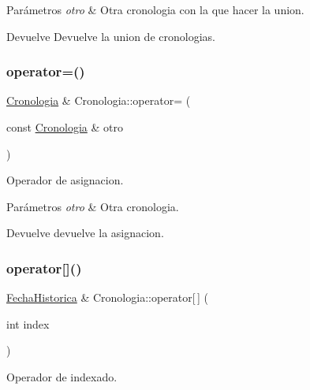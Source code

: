 \begin{DoxyParams}{Parámetros}
{\em otro} & Otra cronologia con la que hacer la union. \\
\hline
\end{DoxyParams}
\begin{DoxyReturn}{Devuelve}
Devuelve la union de cronologias. 
\end{DoxyReturn}
\mbox{\label{classCronologia_a0b6b86e97a98461ff5ecdd7eb72ae4b9}} 
\subsubsection{\texorpdfstring{operator=()}{operator=()}}
{\footnotesize\ttfamily \hyperlink{classCronologia}{Cronologia} \& Cronologia\+::operator= (\begin{DoxyParamCaption}\item[{const \hyperlink{classCronologia}{Cronologia} \&}]{otro }\end{DoxyParamCaption})}



Operador de asignacion. 


\begin{DoxyParams}{Parámetros}
{\em otro} & Otra cronologia. \\
\hline
\end{DoxyParams}
\begin{DoxyReturn}{Devuelve}
devuelve la asignacion. 
\end{DoxyReturn}
\mbox{\label{classCronologia_a4ea242e2ce9c786fb9c3291196c866d9}} 
\subsubsection{\texorpdfstring{operator[]()}{operator[]()}}
{\footnotesize\ttfamily \hyperlink{classFechaHistorica}{Fecha\+Historica} \& Cronologia\+::operator\mbox{[}$\,$\mbox{]} (\begin{DoxyParamCaption}\item[{int}]{index }\end{DoxyParamCaption})}



Operador de indexado. 


